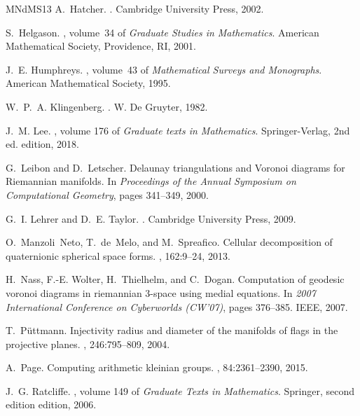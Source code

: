 \documentclass[11pt,twoside]{amsart}
\theoremstyle{plain}
\begin{document}
\begin{thebibliography}{MNdMS13}
A.~Hatcher.
.
\newblock Cambridge University Press, 2002.

S.~Helgason.
,
  volume~34 of {\em Graduate Studies in Mathematics}.
\newblock American Mathematical Society, Providence, RI, 2001.

J.~E. Humphreys.
, volume~43 of
  {\em Mathematical Surveys and Monographs}.
\newblock American Mathematical Society, 1995.

W.~P.~A. Klingenberg.
.
\newblock W. De Gruyter, 1982.

J.~M. Lee.
, volume 176 of {\em
  Graduate texts in Mathematics}.
\newblock Springer-Verlag, 2nd ed. edition, 2018.

G.~Leibon and D.~Letscher.
\newblock Delaunay triangulations and {V}oronoi diagrams for {R}iemannian
  manifolds.
\newblock In {\em Proceedings of the Annual Symposium on Computational
  Geometry}, pages 341--349, 2000.

G.~I. Lehrer and D.~E. Taylor.
.
\newblock Cambridge University Press, 2009.

O.~Manzoli~Neto, T.~de~Melo, and M.~Spreafico.
\newblock Cellular decomposition of quaternionic spherical space forms.
, 162:9--24, 2013.

H.~Nass, F.-E. Wolter, H.~Thielhelm, and C.~Dogan.
\newblock Computation of geodesic voronoi diagrams in riemannian 3-space using
  medial equations.
\newblock In {\em 2007 International Conference on Cyberworlds (CW'07)}, pages
  376--385. IEEE, 2007.

T.~P\"{u}ttmann.
\newblock Injectivity radius and diameter of the manifolds of flags in the
  projective planes.
, 246:795--809, 2004.

A.~Page.
\newblock Computing arithmetic kleinian groups.
, 84:2361--2390, 2015.

J.~G. Ratcliffe.
, volume 149 of {\em
  Graduate Texts in Mathematics}.
\newblock Springer, second edition edition, 2006.


\end{thebibliography}
\end{document}
